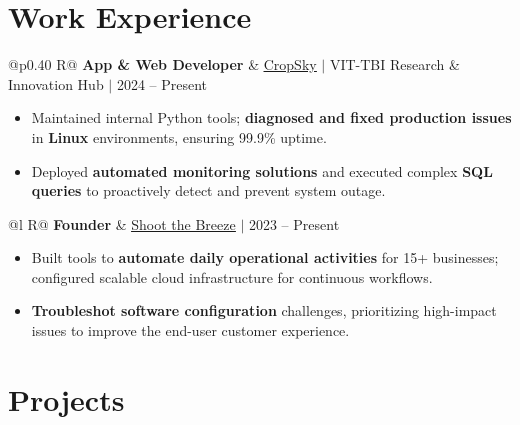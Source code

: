 \documentclass[a4paper,10pt]{article}
\newcommand{\ulink}[2]{\href{#1}{\uline{#2}}}
\newcommand{\subheading}[1]{{\color[HTML]{0A0A0A}\fontsize{12}{14}\selectfont\bfseries #1}}
\newcommand{\meta}[1]{{\color[HTML]{5C5C5C}\fontsize{10.5}{12.5}\selectfont #1}}
\begin{document}
\section{Work Experience}
\vspace{2pt}

\begin{tabularx}{\linewidth}{@{}p{0.40\linewidth} R@{}}
\subheading{App \& Web Developer} & \meta{\ulink{https://sites.google.com/view/cropsky/home}{CropSky} $|$ VIT-TBI Research \& Innovation Hub $|$ 2024 -- Present}
\end{tabularx}
\begin{itemize}[nosep, leftmargin=1.5em, itemsep=1pt, topsep=2pt]
  \item {\color[HTML]{0A0A0A}\fontsize{11}{14}\selectfont Maintained internal Python tools; \textbf{diagnosed and fixed production issues} in \textbf{Linux} environments, ensuring 99.9\% uptime.}
  \item {\color[HTML]{0A0A0A}\fontsize{11}{14}\selectfont Deployed \textbf{automated monitoring solutions} and executed complex \textbf{SQL queries} to proactively detect and prevent system outage.}
\end{itemize}

\vspace{2pt}

\begin{tabularx}{\linewidth}{@{}l R@{}}
\subheading{Founder} & \meta{\ulink{https://shoot-the-breeze.vercel.app}{Shoot the Breeze} $|$ 2023 -- Present}
\end{tabularx}
\begin{itemize}[nosep, leftmargin=1.5em, itemsep=1pt, topsep=2pt]
  \item {\color[HTML]{0A0A0A}\fontsize{11}{14}\selectfont Built tools to \textbf{automate daily operational activities} for 15+ businesses; configured scalable cloud infrastructure for continuous workflows.}
  \item {\color[HTML]{0A0A0A}\fontsize{11}{14}\selectfont \textbf{Troubleshot software configuration} challenges, prioritizing high-impact issues to improve the end-user customer experience.}
\end{itemize}

\vspace{2pt}

\section{Projects}
\vspace{2pt}
\end{document}
